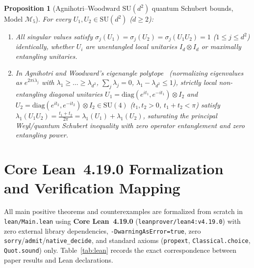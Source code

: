 \documentclass[11pt,a4paper]{article}
\theoremstyle{plain}
\newtheorem{proposition}[theorem]{Proposition}
\theoremstyle{definition}
\newcommand{\diag}{\mathrm{diag}}
\newcommand{\SU}{\mathrm{SU}}
\begin{document}
\begin{proposition}[Agnihotri--Woodward $\SU(d^2)$ quantum Schubert bounds, Model $\mathcal{M}_5$]
\label{prop:m5}
For every $U_1, U_2 \in \SU(d^2)$ ($d \ge 2$):
\begin{enumerate}
  \item All singular values satisfy $\sigma_j(U_1) = \sigma_j(U_2) = \sigma_j(U_1 U_2) = 1$ ($1 \le j \le d^2$) identically, whether $U_i$ are unentangled local unitaries $I_d \otimes I_d$ or maximally entangling unitaries.
  \item In Agnihotri and Woodward's eigenangle polytope~\cite{AW1998} (normalizing eigenvalues as $e^{2\pi i \lambda_j}$ with $\lambda_1 \ge \dots \ge \lambda_{d^2}$, $\sum_j \lambda_j = 0$, $\lambda_1 - \lambda_{d^2} \le 1$), strictly local non-entangling diagonal unitaries $U_1 = \diag(e^{i t_1}, e^{-i t_1}) \otimes I_2$ and $U_2 = \diag(e^{i t_2}, e^{-i t_2}) \otimes I_2 \in \SU(4)$ ($t_1, t_2 > 0$, $t_1 + t_2 < \pi$) satisfy $\lambda_1(U_1 U_2) = \frac{t_1 + t_2}{2\pi} = \lambda_1(U_1) + \lambda_1(U_2)$, saturating the principal Weyl/quantum Schubert inequality with zero operator entanglement and zero entangling power.
\end{enumerate}
\end{proposition}

\section{Core Lean~4.19.0 Formalization and Verification Mapping}

All main positive theorems and counterexamples are formalized from scratch in \texttt{lean/Main.lean} using \textbf{Core Lean~4.19.0} (\texttt{leanprover/lean4:v4.19.0}) with zero external library dependencies, \texttt{-DwarningAsError=true}, zero \texttt{sorry}/\texttt{admit}/\texttt{native\_decide}, and standard axioms (\texttt{propext}, \texttt{Classical.choice}, \texttt{Quot.sound}) only. Table~\ref{tab:lean} records the exact correspondence between paper results and Lean declarations.
\end{document}
